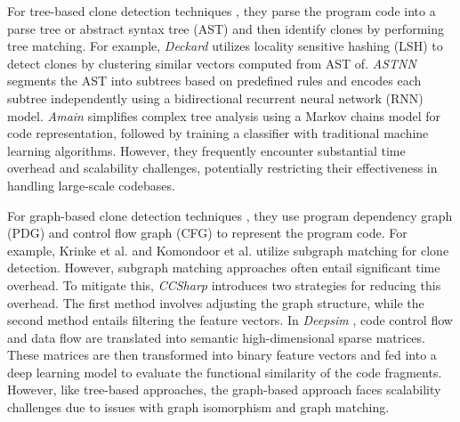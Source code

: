 For tree-based clone detection techniques \cite{jiang2007deckard, wei2017cdlh, zhang2019astnn, liang2021astpath, jo2021twopass, pati2017comparison, chodarev2015haskell, hu2022treecen, wu2022amain}, they parse the program code into a parse tree or abstract syntax tree (AST) and then identify clones by performing tree matching. 
For example, \emph{Deckard} \cite{jiang2007deckard} utilizes locality sensitive hashing (LSH) to detect clones by clustering similar vectors computed from AST of. 
\emph{ASTNN} \cite{zhang2019astnn} segments the AST into subtrees based on predefined rules and encodes each subtree independently using a bidirectional recurrent neural network (RNN) model.
\emph{Amain} \cite{wu2022amain} simplifies complex tree analysis using a Markov chains model for code representation, followed by training a classifier with traditional machine learning algorithms.
However, they frequently encounter substantial time overhead and scalability challenges, potentially restricting their effectiveness in handling large-scale codebases.

For graph-based clone detection techniques \cite{krinke2001duplix, komondoor2001pdgdup, wang2017ccsharp, zhao2018deepsim, wu2020scdetector, zou2020ccgraph}, they use program dependency graph (PDG) and control flow graph (CFG) to represent the program code. 
For example, Krinke et al. \cite{krinke2001duplix} and Komondoor et al. \cite{komondoor2001pdgdup} utilize subgraph matching for clone detection. 
However, subgraph matching approaches often entail significant time overhead. 
To mitigate this, \emph{CCSharp} \cite{wang2017ccsharp} introduces two strategies for reducing this overhead. 
The first method involves adjusting the graph structure, while the second method entails filtering the feature vectors. 
In \emph{Deepsim} \cite{zhao2018deepsim}, code control flow and data flow are translated into semantic high-dimensional sparse matrices. These matrices are then transformed into binary feature vectors and fed into a deep learning model to evaluate the functional similarity of the code fragments.
However, like tree-based approaches, the graph-based approach faces scalability challenges due to issues with graph isomorphism and graph matching.

